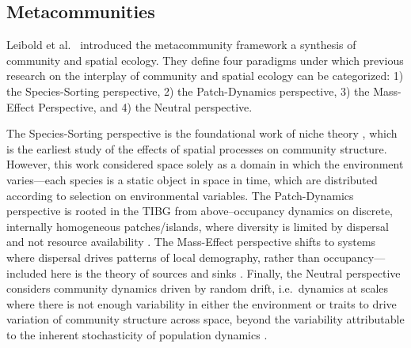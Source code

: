 \documentclass[]{article}
\begin{document}
\hypertarget{metacommunities}{%
\subsection{Metacommunities}\label{metacommunities}}

Leibold et al.~\citep{leibold_metacommunity_2004} introduced
the metacommunity framework a synthesis of community and spatial
ecology. They define four paradigms under which previous research on the
interplay of community and spatial ecology can be categorized: 1) the
Species-Sorting perspective, 2) the Patch-Dynamics perspective, 3) the
Mass-Effect Perspective, and 4) the Neutral perspective.

The Species-Sorting perspective is the foundational work of niche theory  \citep{hutchinson_ecological_1973,chase_ecological_2003}, which is the earliest study of the effects of spatial processes on community
structure. However, this work considered space solely as a
domain in which the environment varies---each species is a
static object in space in time, which are distributed according to
selection on environmental variables. The Patch-Dynamics perspective is rooted in the TIBG from
above--occupancy dynamics on discrete, internally homogeneous
patches/islands, where diversity is limited by dispersal and not
resource availability \cite{leibold_metacommunity_2004}. The Mass-Effect perspective shifts to systems where dispersal drives patterns of local demography, rather than
occupancy---included here is the theory of sources and sinks \cite{pulliam_sources_1988, mouquet_community_2003}. Finally, the
Neutral perspective considers community dynamics driven by random drift,
i.e.~dynamics at scales where there is not enough variability in either
the environment or traits to drive variation of community structure across
space, beyond the variability attributable to the inherent
stochasticity of population dynamics \cite{hubbell_unified_2001, hubbell_unified_2011}.
\end{document}
